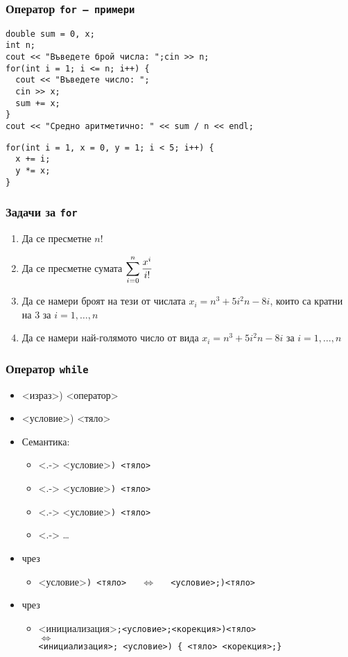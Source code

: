\documentclass{beamer}
\newcommand{\expsum}{\displaystyle \sum_{i=0}^n \limits \frac{x^i}{i!}}
\begin{document}
\begin{frame}
  \frametitle{Оператор \tt{for} --- примери}

\begin{lstlisting}
double sum = 0, x;
int n;
cout << "Въведете брой числа: ";cin >> n;
for(int i = 1; i <= n; i++) {
  cout << "Въведете число: ";
  cin >> x;
  sum += x;
}
cout << "Средно аритметично: " << sum / n << endl;
\end{lstlisting}
\pause
\begin{lstlisting}
for(int i = 1, x = 0, y = 1; i < 5; i++) {
  x += i;
  y *= x;
}
\end{lstlisting}
\end{frame}

\begin{frame}
  \frametitle{Задачи за \tt{for}}
  
  \begin{enumerate}[<+->]
  \item Да се пресметне $n!$
  \item Да се пресметне сумата $\expsum$
  \item Да се намери броят на тези от числата $x_i = n^3 + 5i^2n -8i$, които са кратни на 3 за $i=1,\ldots,n$
  \item Да се намери най-голямото число от вида $x_i = n^3 + 5i^2n -8i$ за $i=1,\ldots,n$
  \end{enumerate}
\end{frame}

\begin{frame}
  \frametitle{Оператор \tt{while}}
  
  \begin{itemize}[<+->]
  \item {}<израз>\tta) <оператор>
  \item {}<условие>\tta) <тяло>
  \item Семантика:
    \begin{itemize}
    \item<.-> <условие>\tt) <тяло>
    \item<.-> <условие>\tt) <тяло>
    \item<.-> <условие>\tt) <тяло>
    \item<.-> \ldots
    \end{itemize}
  \item {} чрез 
    \begin{itemize}
    \item {}<условие>\tt) <тяло> $\quad\Leftrightarrow\quad$
      <условие>\tt{;)}<тяло>
    \end{itemize}
  \item {} чрез 
    \begin{itemize}
    \item {}<инициализация>\tt;<условие>\tt;<корекция>\tt)<тяло>\\
      $\Leftrightarrow$\\
      <инициализация>\tt; <условие>\tt{) \{ }<тяло> <корекция>\tt{;\}}
    \end{itemize}
  \end{itemize}
\end{frame}
\end{document}

